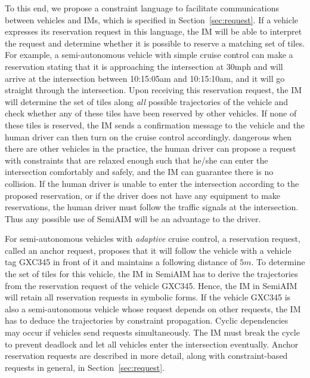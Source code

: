 To this end, we propose a constraint language to facilitate
communications between vehicles and IMs, which is specified in
Section~\ref{sec:request}.  If a vehicle expresses its reservation
request in this language, the IM will be able to interpret the request
and determine whether it is possible to reserve a matching set of
tiles.  For example, a semi-autonomous vehicle with simple cruise
control can make a reservation stating that it is approaching the
intersection at 30mph and will arrive at the intersection between
10:15:05am and 10:15:10am, and it will go straight through the
intersection.  Upon receiving this reservation request, the IM will
determine the set of tiles along \emph{all} possible trajectories of
the vehicle and check whether any of these tiles have been reserved by
other vehicles.  If none of these tiles is reserved, the IM sends a
confirmation message to the vehicle and the human driver can then turn
on the cruise control accordingly.  %
dangerous when there are other vehicles in the %
practice, the human driver can propose a request with constraints that
are relaxed enough such that he/she can enter the intersection
comfortably and safely, and the IM can guarantee there is no
collision. If the human driver is unable to enter the intersection
according to the proposed reservation, or if the driver does not have
any equipment to make reservations, the human driver must follow the
traffic signals at the intersection.  Thus any possible use of SemiAIM
will be an advantage to the driver.


For semi-autonomous vehicles with \emph{adaptive} cruise control, a
reservation request, called an anchor request, proposes that it will
follow the vehicle with a vehicle tag GXC345 in front of it and
maintains a following distance of $5m$.  To determine the set of tiles
for this vehicle, the IM in SemiAIM has to derive the trajectories
from the reservation request of the vehicle GXC345.  Hence, the IM in
SemiAIM will retain all reservation requests in symbolic forms.  If
the vehicle GXC345 is also a semi-autonomous vehicle whose request
depends on other requests, the IM has to deduce the trajectories by
constraint propagation.  Cyclic dependencies may occur if vehicles send
requests simultaneously. The IM must break the cycle to prevent
deadlock and let all vehicles enter the intersection eventually.
Anchor reservation requests are described in more detail, along with
constraint-based requests in general, in Section~\ref{sec:request}.


